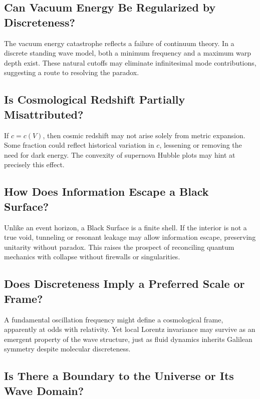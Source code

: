 \documentclass[12pt]{article}
\begin{document}
\subsection{Can Vacuum Energy Be Regularized by Discreteness?}

The vacuum energy catastrophe reflects a failure of continuum theory. In a discrete standing wave model, both a minimum frequency and a maximum warp depth exist. These natural cutoffs may eliminate infinitesimal mode contributions, suggesting a route to resolving the paradox.

\subsection{Is Cosmological Redshift Partially Misattributed?}

If $c = c(V)$, then cosmic redshift may not arise solely from metric expansion. Some fraction could reflect historical variation in $c$, lessening or removing the need for dark energy. The convexity of supernova Hubble plots may hint at precisely this effect.

\subsection{How Does Information Escape a Black Surface?}

Unlike an event horizon, a Black Surface is a finite shell. If the interior is not a true void, tunneling or resonant leakage may allow information escape, preserving unitarity without paradox. This raises the prospect of reconciling quantum mechanics with collapse without firewalls or singularities.

\subsection{Does Discreteness Imply a Preferred Scale or Frame?}

A fundamental oscillation frequency might define a cosmological frame, apparently at odds with relativity. Yet local Lorentz invariance may survive as an emergent property of the wave structure, just as fluid dynamics inherits Galilean symmetry despite molecular discreteness.

\subsection{Is There a Boundary to the Universe or Its Wave Domain?}
\end{document}
